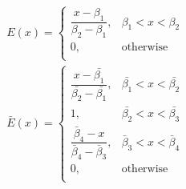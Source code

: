 \documentclass[paper=a4, fontsize=11pt]{scrartcl}
\numberwithin{equation}{section}		%
\numberwithin{figure}{section}			%
\numberwithin{table}{section}				%
\begin{document}
\begin{align}
  E(x)=\begin{cases}
  \dfrac{x - \beta_1}{\beta_2 - \beta_1},& \beta_1 < x < \beta_2 \\
  0, & \text{otherwise} \\
  \end{cases} \\ 
  \bar{E}(x)=\begin{cases}
  \dfrac{x - \bar{\beta_1}}{\bar{\beta_2} - \bar{\beta_1}} , & \bar{\beta_1} < x < \bar{\beta_2} \\
  1, & \bar{\beta_2} < x < \bar{\beta_3} \\
  \dfrac{\bar{\beta}_4 - x}{\bar{\beta}_4 - \bar{\beta}_3},   & \bar{\beta}_3 < x < \bar{\beta}_4 \\
  0, & \text{otherwise}  \label{Evaluation Functions} \\
        \end{cases}        
\end{align}
\end{document}
